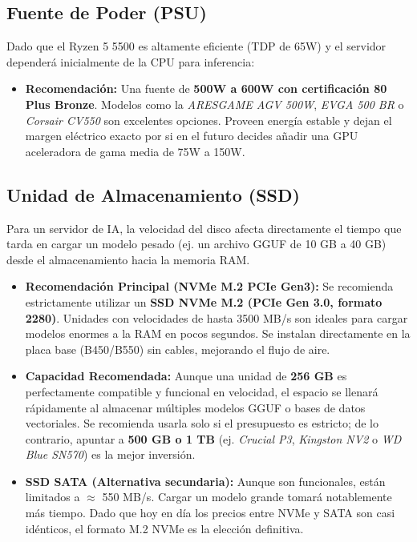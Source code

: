 \documentclass[12pt,a4paper]{article}
\begin{document}
\subsection{Fuente de Poder (PSU)}
Dado que el Ryzen 5 5500 es altamente eficiente (TDP de 65W) y el servidor dependerá inicialmente de la CPU para inferencia:
\begin{itemize}
    \item \textbf{Recomendación:} Una fuente de \textbf{500W a 600W con certificación 80 Plus Bronze}. Modelos como la \textit{ARESGAME AGV 500W}, \textit{EVGA 500 BR} o \textit{Corsair CV550} son excelentes opciones. Proveen energía estable y dejan el margen eléctrico exacto por si en el futuro decides añadir una GPU aceleradora de gama media de 75W a 150W.
\end{itemize}

\subsection{Unidad de Almacenamiento (SSD)}
Para un servidor de IA, la velocidad del disco afecta directamente el tiempo que tarda en cargar un modelo pesado (ej. un archivo GGUF de 10 GB a 40 GB) desde el almacenamiento hacia la memoria RAM.
\begin{itemize}
    \item \textbf{Recomendación Principal (NVMe M.2 PCIe Gen3):} Se recomienda estrictamente utilizar un \textbf{SSD NVMe M.2 (PCIe Gen 3.0, formato 2280)}. Unidades con velocidades de hasta 3500 MB/s son ideales para cargar modelos enormes a la RAM en pocos segundos. Se instalan directamente en la placa base (B450/B550) sin cables, mejorando el flujo de aire.
    \item \textbf{Capacidad Recomendada:} Aunque una unidad de \textbf{256 GB} es perfectamente compatible y funcional en velocidad, el espacio se llenará rápidamente al almacenar múltiples modelos GGUF o bases de datos vectoriales. Se recomienda usarla solo si el presupuesto es estricto; de lo contrario, apuntar a \textbf{500 GB o 1 TB} (ej. \textit{Crucial P3}, \textit{Kingston NV2} o \textit{WD Blue SN570}) es la mejor inversión.
    \item \textbf{SSD SATA (Alternativa secundaria):} Aunque son funcionales, están limitados a $\approx$ 550 MB/s. Cargar un modelo grande tomará notablemente más tiempo. Dado que hoy en día los precios entre NVMe y SATA son casi idénticos, el formato M.2 NVMe es la elección definitiva.
\end{itemize}
\end{document}
